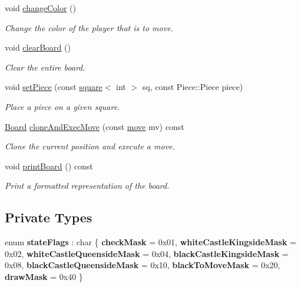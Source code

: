 \begin{DoxyCompactItemize}
void \hyperlink{classBoard_ac33aaf879882d2c1abbab14c9727f2f9}{change\+Color} ()
\begin{DoxyCompactList}\small\item\em Change the color of the player that is to move. \end{DoxyCompactList}\item 
\mbox{\label{classBoard_a5f148daa03da25d40dff3fc613568d6f}} 
void \hyperlink{classBoard_a5f148daa03da25d40dff3fc613568d6f}{clear\+Board} ()
\begin{DoxyCompactList}\small\item\em Clear the entire board. \end{DoxyCompactList}\item 
\mbox{\label{classBoard_a2a15fa8b4b4db9d11093c6c806344fc6}} 
void \hyperlink{classBoard_a2a15fa8b4b4db9d11093c6c806344fc6}{set\+Piece} (const \hyperlink{structsquare}{square}$<$ int $>$ sq, const Piece\+::\+Piece piece)
\begin{DoxyCompactList}\small\item\em Place a piece on a given square. \end{DoxyCompactList}\item 
\hyperlink{classBoard}{Board} \hyperlink{classBoard_a3eb8e7257733fd3b9e00c8c37b8cc433}{clone\+And\+Exec\+Move} (const \hyperlink{structmove}{move} mv) const
\begin{DoxyCompactList}\small\item\em Clone the current position and execute a move. \end{DoxyCompactList}\item 
void \hyperlink{classBoard_a3f5b48d92226217de5d488f3d5fb234a}{print\+Board} () const
\begin{DoxyCompactList}\small\item\em Print a formatted representation of the board. \end{DoxyCompactList}\end{DoxyCompactItemize}
\subsection*{Private Types}
\begin{DoxyCompactItemize}
\item 
\mbox{\label{classBoard_a6f2173ec700556df381b6623a5482850}} 
enum {\bfseries state\+Flags} \+: char \{ \newline
{\bfseries check\+Mask} = 0x01, 
{\bfseries white\+Castle\+Kingside\+Mask} = 0x02, 
{\bfseries white\+Castle\+Queenside\+Mask} = 0x04, 
{\bfseries black\+Castle\+Kingside\+Mask} = 0x08, 
\newline
{\bfseries black\+Castle\+Queenside\+Mask} = 0x10, 
{\bfseries black\+To\+Move\+Mask} = 0x20, 
{\bfseries draw\+Mask} = 0x40
 \}
\end{DoxyCompactItemize}

